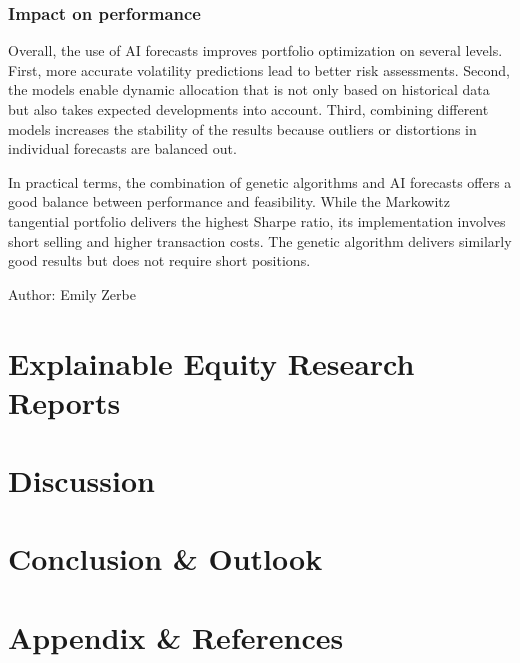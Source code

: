 \documentclass{agasthesis}
\begin{document}
\subsection{Impact on performance}
Overall, the use of AI forecasts improves portfolio optimization on several levels. First, more accurate volatility predictions lead to better risk assessments. 
Second, the models enable dynamic allocation that is not only based on historical data but also takes expected developments into account. Third, combining different 
models increases the stability of the results because outliers or distortions in individual forecasts are balanced out.

In practical terms, the combination of genetic algorithms and AI forecasts offers a good balance between performance and feasibility. While the Markowitz tangential portfolio 
delivers the highest Sharpe ratio, its implementation involves short selling and higher transaction costs. The genetic algorithm delivers similarly good results but does not require short positions.

Author: Emily Zerbe

\chapter{Explainable Equity Research Reports}
\chapter{Discussion}
\chapter{Conclusion & Outlook}
\chapter{Appendix & References}


\listoffigures
\cleardoublepage
\listoftables





\end{document}
